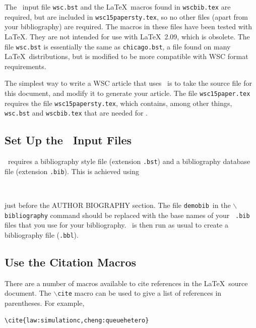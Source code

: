 \documentclass{wscpaperproc}
\theoremstyle{wsc}
\begin{document}
The \BibTeX\ input file {\tt wsc.bst} and the \LaTeX\ macros found in {\tt wscbib.tex} are required, but are included in {\tt wsc15papersty.tex}, so no other files (apart from your bibliography) are required.
The macros in these files have been tested with \LaTeX. They are not intended for use with \LaTeX\ 2.09, which is obsolete.
The file {\tt wsc.bst} is essentially the same as {\tt chicago.bst}, a file found on many \LaTeX\ distributions, but is
modified to be more compatible with WSC format requirements.

The simplest way to write a WSC article that uses \BibTeX\ is to take the source file for this document, and modify it to generate your article. The file {\tt wsc15paper.tex} requires the file {\tt wsc15papersty.tex}, which contains, among other things, {\tt wsc.bst} and {\tt wscbib.tex} that are needed for \BibTeX.

\subsection{Set Up the \BibTeX\ Input Files}

\BibTeX\ requires a bibliography style file (extension \texttt{.bst}) and a bibliography database file (extension \texttt{.bib}).  This is achieved
using\newline


\begin{verbatim}


\end{verbatim}\vspace{5mm}

\noindent just before the AUTHOR BIOGRAPHY section.  The file {\tt demobib}\ in the {\tt $\backslash$bibliography} command should be replaced with the base names of your \BibTeX\ {\tt *.bib} files that you use for your bibliography.  \BibTeX\ is then run as usual to create a bibliography file ({\tt *.bbl}).

\subsection{Use the Citation Macros}
There are a number of macros available to cite references in the \LaTeX\ source document.  The {\tt $\backslash$cite} macro can be used to give a list of references in parentheses.  For example,\newline

\begin{verbatim}
\cite{law:simulationc,cheng:queuehetero}
\end{verbatim}\vspace{5mm}
\end{document}

